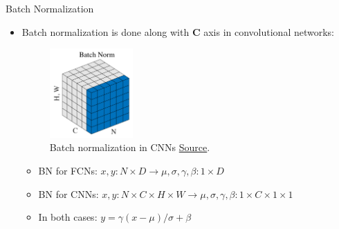 \begin{frame}{Batch Normalization}
\begin{itemize}
\item Batch normalization is done along with \textbf{C} axis in convolutional networks:
\begin{figure}
	\centering
	\includegraphics[width=0.3\textwidth]{Figs/batch normalization for cnn.png}
	\caption{Batch normalization in CNNs \href{https://arxiv.org/pdf/1803.08494.pdf}{Source}.}
	\label{fig:batch normalization for cnn}
\end{figure}
\begin{itemize}
\item BN for FCNs: $x, y: N\times D \rightarrow \mu, \sigma, \gamma, \beta: 1\times D$
\item BN for CNNs: $x, y: N\times C \times H \times W \rightarrow \mu, \sigma, \gamma, \beta: 1\times C \times 1 \times 1$
\item In both cases: $y = \gamma (x - \mu) / \sigma + \beta$
\end{itemize}
\end{itemize}

\end{frame}